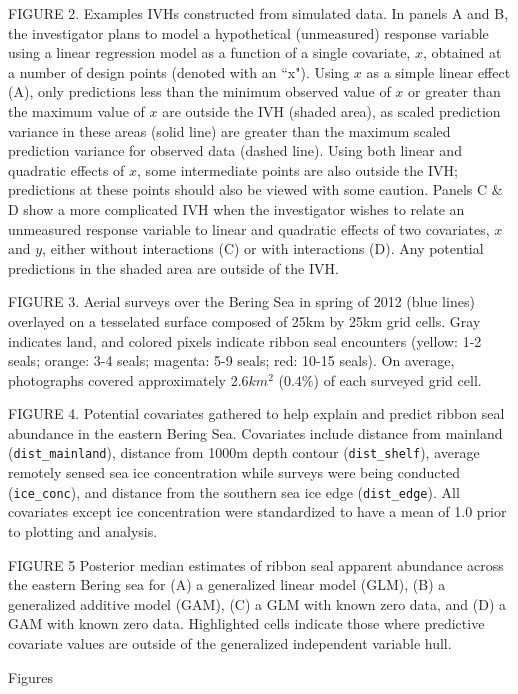 \documentclass[12pt,english]{article}
\begin{document}
\begin{spacing}{1.9}
FIGURE 2. Examples IVHs constructed from simulated data.  In panels A and B, the investigator plans to model a hypothetical (unmeasured) response variable using a linear regression model as a function of a single covariate, $x$, obtained at a number of design points (denoted with an ``x").  Using $x$ as a simple linear effect (A), only predictions less than the minimum observed value of $x$ or greater than the maximum value of $x$ are outside the IVH (shaded area), as scaled prediction variance in these areas (solid line) are greater than the maximum scaled prediction variance for observed data (dashed line).  Using both linear and quadratic effects of $x$, some intermediate points are also outside the IVH; predictions at these points should also be viewed with some caution.  Panels C $\&$ D show a more complicated IVH when the investigator wishes to relate an unmeasured response variable to linear and quadratic effects of two covariates, $x$ and $y$, either without interactions (C) or with interactions (D).  Any potential predictions in the shaded area are outside of the IVH.

FIGURE 3. Aerial surveys over the Bering Sea in spring of 2012 (blue lines) overlayed on
a tesselated surface composed of 25km by 25km grid cells.  Gray indicates land, and colored pixels indicate ribbon seal encounters (yellow: 1-2 seals; orange: 3-4 seals; magenta: 5-9 seals; red: 10-15 seals).  On average, photographs covered approximately $2.6km^2$ ($0.4\%$) of each surveyed grid cell.

FIGURE 4. Potential covariates gathered to help explain and predict ribbon seal abundance in the eastern Bering Sea.  Covariates include distance from mainland (\texttt{dist\_mainland}), distance from 1000m depth contour (\texttt{dist\_shelf}), average remotely sensed sea ice concentration while surveys were being conducted (\texttt{ice\_conc}), and distance from the southern sea ice edge (\texttt{dist\_edge}).  All covariates except ice concentration were standardized to have a mean of 1.0 prior to plotting and analysis.

FIGURE 5  Posterior median estimates of ribbon seal apparent abundance across the eastern Bering sea for (A) a generalized linear model (GLM), (B) a generalized additive model (GAM), (C) a GLM with known zero data, and (D) a GAM with known zero data.  Highlighted cells indicate those where predictive covariate values are outside of the generalized independent variable hull.

\clearpage
\centerline{\sc Figures}




\end{spacing}
\end{document}
